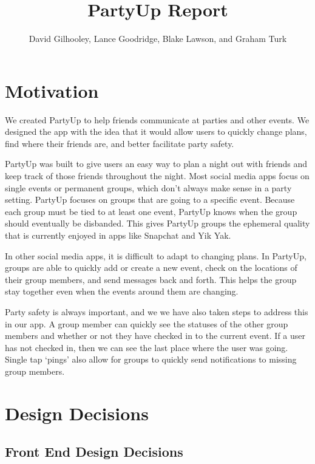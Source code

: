 \documentclass[12pt]{article}
\title{PartyUp Report}
\author{David Gilhooley, Lance Goodridge, Blake Lawson, and Graham Turk}
\begin{document}
\pagestyle{plain}

\maketitle

\section{Motivation} %
\label{sec:Motivation}
We created PartyUp to help friends communicate at parties and other events.
We designed the app with the idea that it would allow users to quickly change plans, find where their friends are, and better facilitate party safety.

PartyUp was built to give users an easy way to plan a night out with friends and keep track of those friends throughout the night.
Most social media apps focus on single events or permanent groups, which don't always make sense in a party setting.
PartyUp focuses on groups that are going to a specific event.
Because each group must be tied to at least one event, PartyUp knows when the group should eventually be disbanded.
This gives PartyUp groups the ephemeral quality that is currently enjoyed in apps like Snapchat and Yik Yak.

In other social media apps, it is difficult to adapt to changing plans.
In PartyUp, groups are able to quickly add or create a new event, check on the locations of their group members, and send messages back and forth. This helps the group stay together even when the events around them are changing. 

Party safety is always important, and we we have also taken steps to address this in our app. A group member can quickly see the statuses of the other group members and whether or not they have checked in to the current event. If a user has not checked in, then we can see the last place where the user was going. Single tap `pings' also allow for groups to quickly send notifications to missing group members.

\section{Design Decisions} %
\label{sec:design_decisions}


\subsection{Front End Design Decisions}
\end{document}
